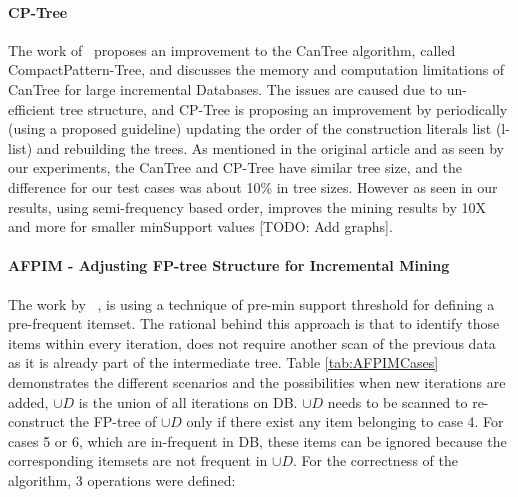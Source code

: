 \paragraph{CP-Tree}
\label{par:cptree}
	The work of~\cite{tanbeer2009efficient} proposes an improvement to the CanTree algorithm, called CompactPattern-Tree, and discusses the memory and computation limitations of CanTree for large incremental Databases. The issues are caused due to un-efficient tree structure, and CP-Tree is proposing an improvement by periodically (using a proposed guideline) updating the order of the construction literals list (l-list) and rebuilding the trees. As mentioned in the original article and as seen by our experiments, the CanTree and CP-Tree have similar tree size, and the difference for our test cases was about 10\% in tree sizes. However as seen in our results, using semi-frequency based order, improves the mining results by 10X and more for smaller minSupport values [TODO: Add graphs].


\paragraph{AFPIM - Adjusting FP-tree Structure for Incremental Mining }
\label{par:AFPIM}
  The work by ~\cite{koh2004efficient}, is using a technique of pre-min support threshold for defining a pre-frequent itemset. The rational behind this approach is that to identify those items within every iteration, does not require another scan of the previous data as it is already part of the intermediate tree.  Table \ref{tab:AFPIMCases} demonstrates the different scenarios and the possibilities when new iterations are added, $ \cup D $ is the union of all iterations on DB. $ \cup D $ needs to be scanned to re-construct the FP-tree of
$ \cup D $  only if there exist any item belonging to case 4. For cases 5 or 6, which are in-frequent in DB, these items can be ignored because the corresponding itemsets are not frequent in $ \cup D $.  For the correctness of the algorithm, 3 operations were defined:

